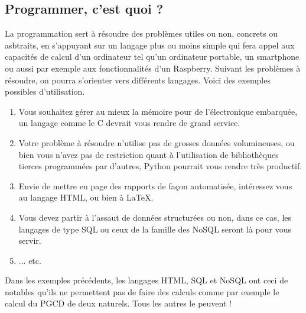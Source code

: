 \subsection{Programmer, c'est quoi ?}

La programmation sert à résoudre des problèmes utiles ou non, concrets ou asbtraits, en s'appuyant sur un langage plus ou moins simple qui fera appel aux capacités de calcul d'un ordinateur tel qu'un ordinateur portable, un smartphone ou aussi par exemple aux fonctionnalités d'un Raspberry. Suivant les problèmes à résoudre, on pourra s'orienter vers différents langages. Voici des exemples possibles d'utilisation.

\begin{enumerate}
\item Vous souhaitez gérer au mieux la mémoire pour de l'électronique embarquée, un langage comme le C devrait vous rendre de grand service.

\item Votre problème à résoudre n'utilise pas de grosses données volumineuses, ou bien vous n'avez pas de restriction quant à l'utilisation de bibliothèques tierces programmées par d'autres, Python pourrait vous rendre très productif.

\item Envie de mettre en page des rapports de façon automatisée, intéressez vous au langage HTML, ou bien à LaTeX.

\item Vous devez partir à l'assaut de données structurées ou non, dans ce cas, les langages de type SQL ou ceux de la famille des NoSQL seront là pour vous servir.

\item ... etc.

\end{enumerate}

Dans les exemples précédents, les langages HTML, SQL et NoSQL ont ceci de notables qu'ils ne permettent pas de faire des calculs comme par exemple le calcul du PGCD de deux naturels. Tous les autres le peuvent !
